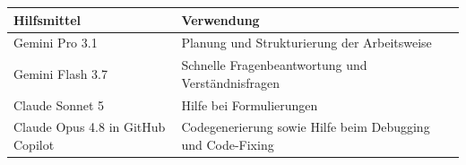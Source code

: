 \documentclass[a4paper,12pt]{article}
\begin{document}
    \begin{table}[htbp]
        \centering
        \label{tab:ki-nutzung}
        \vspace{0.5em}
        \begin{tabular}{>{\raggedright\arraybackslash}p{} p{}}
            \toprule
            \textbf{Hilfsmittel} & \textbf{Verwendung} \\
            \midrule
            Gemini Pro 3.1 & Planung und Strukturierung der Arbeitsweise \\
            Gemini Flash 3.7 & Schnelle Fragenbeantwortung und Verständnisfragen \\
            Claude Sonnet 5 & Hilfe bei Formulierungen \\
            Claude Opus 4.8 in GitHub Copilot & Codegenerierung sowie Hilfe beim Debugging und Code-Fixing \\
            \bottomrule
        \end{tabular}
    \end{table}
\end{document}

